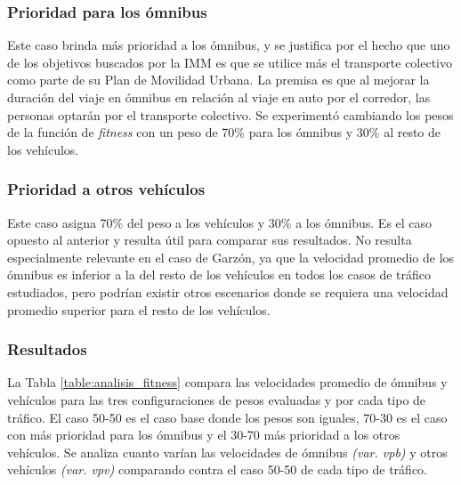 \subsubsection{Prioridad para los ómnibus}
Este caso brinda más prioridad a los ómnibus, y se justifica por el hecho que uno de los objetivos buscados por la IMM es que se utilice más el transporte colectivo como parte de su Plan de Movilidad Urbana. La premisa es que al mejorar la duración del viaje en ómnibus en relación al viaje en auto por el corredor, las personas optarán por el transporte colectivo. Se experimentó cambiando los pesos de la función de \emph{fitness} con un peso de 70\% para los ómnibus y 30\% al resto de los vehículos.

\newpage

\subsubsection{Prioridad a otros vehículos}

Este caso asigna 70\% del peso a los vehículos y 30\% a los ómnibus. Es el caso opuesto al anterior y resulta útil para comparar sus resultados. No resulta especialmente relevante en el caso de Garzón, ya que la velocidad promedio de los ómnibus es inferior a la del resto de los  vehículos en todos los casos de tráfico estudiados, pero podrían existir otros escenarios donde se requiera una velocidad promedio superior para el resto de los vehículos.

\subsubsection{Resultados}

La Tabla \ref{table:analisis_fitness} compara las velocidades promedio de ómnibus y vehículos para las tres configuraciones de pesos evaluadas y por cada tipo de tráfico.  El caso 50-50 es el caso base donde los pesos son iguales, 70-30 es el caso con más prioridad para los ómnibus y el 30-70 más prioridad a los otros vehículos. Se analiza cuanto varían las velocidades de ómnibus \emph{(var. vpb)} y otros vehículos \emph{(var. vpv)} comparando contra el caso 50-50 de cada tipo de tráfico.


